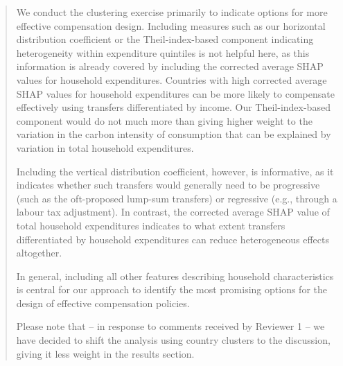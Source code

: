 \documentclass[11pt]{article}
\newenvironment{response}
{\begin{quote}\color{black}}
{\end{quote}}
\begin{document}
\begin{response}
    We conduct the clustering exercise primarily to indicate options for more effective compensation design. Including measures such as our horizontal distribution coefficient or the Theil-index-based component indicating heterogeneity within expenditure quintiles is not helpful here, as this information is already covered by including the corrected average SHAP values for household expenditures. Countries with high corrected average SHAP values for household expenditures can be more likely to compensate effectively using transfers differentiated by income. Our Theil-index-based component would do not much more than giving higher weight to the variation in the carbon intensity of consumption that can be explained by variation in total household expenditures.

    Including the vertical distribution coefficient, however, is informative, as it indicates whether such transfers would generally need to be progressive (such as the oft-proposed lump-sum transfers) or regressive (e.g., through a labour tax adjustment). In contrast, the corrected average SHAP value of total household expenditures indicates to what extent transfers differentiated by household expenditures can reduce heterogeneous effects altogether.

    In general, including all other features describing household characteristics is central for our approach to identify the most promising options for the design of effective compensation policies.


    Please note that -- in response to comments received by Reviewer 1 -- we have decided to shift the analysis using country clusters to the discussion, giving it less weight in the results section. 
\end{response}
\end{document}
